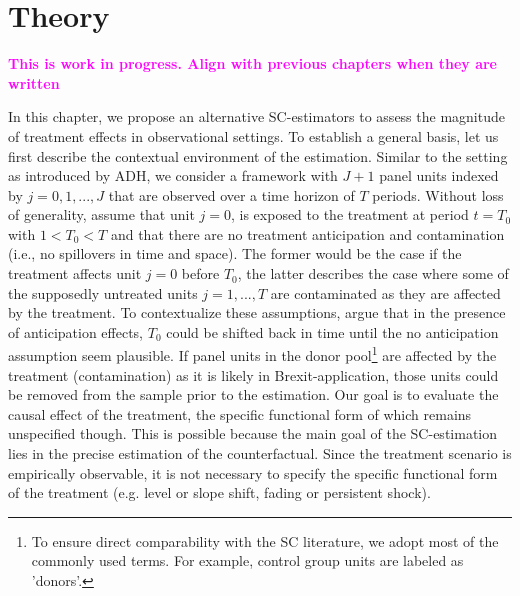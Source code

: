 \section{Theory}
\textcolor{magenta}{\textbf{This is work in progress. Align with previous chapters when they are written}}


\begin{comment}
\textcolor{magenta}{\textbf{What must be clear by now
	 \begin{itemize}
	 	\item Consider case without covariates
	 	\item Make clear that SC is a weighted average of the donors
	 \end{itemize}}}
\end{comment}
In this chapter, we propose an alternative \ac{SC}-estimators to assess the magnitude of treatment effects in observational settings. To establish a general basis, let us first describe the contextual environment of the estimation. Similar to the setting as introduced by \ac{ADH}, we consider a framework with $J+1$ panel units indexed by $j = 0,1, ..., J$ that are observed over a time horizon of $T$ periods. Without loss of generality, assume that unit $j = 0$, is exposed to the treatment at period $t = T_0$ with $1 < T_0 < T$ and that there are no treatment anticipation and contamination (i.e., no spillovers in time and space). The former would be the case if the treatment affects unit $j = 0$ before $T_0$, the latter describes the case where some of the supposedly untreated units $j = 1,...,T$ are contaminated as they are affected by the treatment. To contextualize these assumptions, \cite{abadie:2010} argue that in the presence of anticipation effects, $T_0$ could be shifted back in time until the no anticipation assumption seem plausible. If panel units in the donor pool\footnote{To ensure direct comparability with the \ac{SC} literature, we adopt most of the commonly used terms. For example, control group units are labeled as 'donors'.} are affected by the treatment (contamination) as it is likely in Brexit-application, those units could be removed from the sample prior to the estimation. Our goal is to evaluate the causal effect of the treatment, the specific functional form of which remains unspecified though. This is possible because the main goal of the \ac{SC}-estimation lies in the precise estimation of the counterfactual. Since the treatment  scenario is empirically observable, it is not necessary to specify the specific functional form of the treatment (e.g. level or slope shift, fading or persistent shock).

